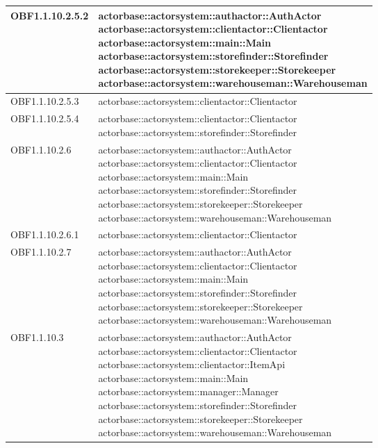 \documentclass{scalatekids-article}
\begin{document}
\begin{longtable}[H]{|p{5cm}|p{12cm}|}
\hline
OBF1.1.10.2.5.2 & \multiLineCell[t]{actorbase::actorsystem::authactor::AuthActor\\actorbase::actorsystem::clientactor::Clientactor\\actorbase::actorsystem::main::Main\\actorbase::actorsystem::storefinder::Storefinder\\actorbase::actorsystem::storekeeper::Storekeeper\\actorbase::actorsystem::warehouseman::Warehouseman\\}\\
\hline
OBF1.1.10.2.5.3 & \multiLineCell[t]{actorbase::actorsystem::clientactor::Clientactor\\}\\
\hline
OBF1.1.10.2.5.4 & \multiLineCell[t]{actorbase::actorsystem::clientactor::Clientactor\\actorbase::actorsystem::storefinder::Storefinder\\}\\
\hline
OBF1.1.10.2.6 & \multiLineCell[t]{actorbase::actorsystem::authactor::AuthActor\\actorbase::actorsystem::clientactor::Clientactor\\actorbase::actorsystem::main::Main\\actorbase::actorsystem::storefinder::Storefinder\\actorbase::actorsystem::storekeeper::Storekeeper\\actorbase::actorsystem::warehouseman::Warehouseman\\}\\
\hline
OBF1.1.10.2.6.1 & \multiLineCell[t]{actorbase::actorsystem::clientactor::Clientactor\\}\\
\hline
OBF1.1.10.2.7 & \multiLineCell[t]{actorbase::actorsystem::authactor::AuthActor\\actorbase::actorsystem::clientactor::Clientactor\\actorbase::actorsystem::main::Main\\actorbase::actorsystem::storefinder::Storefinder\\actorbase::actorsystem::storekeeper::Storekeeper\\actorbase::actorsystem::warehouseman::Warehouseman\\}\\
\hline
OBF1.1.10.3 & \multiLineCell[t]{actorbase::actorsystem::authactor::AuthActor\\actorbase::actorsystem::clientactor::Clientactor\\actorbase::actorsystem::clientactor::ItemApi\\actorbase::actorsystem::main::Main\\actorbase::actorsystem::manager::Manager\\actorbase::actorsystem::storefinder::Storefinder\\actorbase::actorsystem::storekeeper::Storekeeper\\actorbase::actorsystem::warehouseman::Warehouseman\\}\\

\end{longtable}
\end{document}
